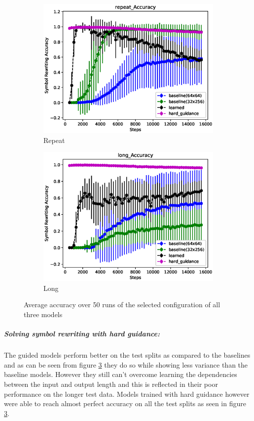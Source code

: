 \begin{figure}[H]
\begin{subfigure}{0.5\linewidth}
		\includegraphics[width=0.95\linewidth]{./figs/sr/repeat-acc-eps}
		\caption{Repeat}\label{repeat-acc}
	\end{subfigure}
	\begin{subfigure}{0.5\linewidth}
		\includegraphics[width=0.95\linewidth]{./figs/sr/long-acc-eps}
		\caption{Long}\label{long-acc}
	\end{subfigure}
	\caption{Average accuracy over 50 runs of the selected configuration of all three models}\label{sr-all-acc}
\end{figure}

\subparagraph{Solving symbol rewriting with hard guidance:} The guided models perform better on the test splits as compared to the baselines and as can be seen from figure \ref{sr-all-acc} they do so while showing less variance than the baseline models. However they still can't overcome learning the dependencies between the input and output length and this is reflected in their poor performance on the longer test data. Models trained with hard guidance however were able to reach almost perfect accuracy on all the test splits as seen in figure \ref{sr-all-acc}.


